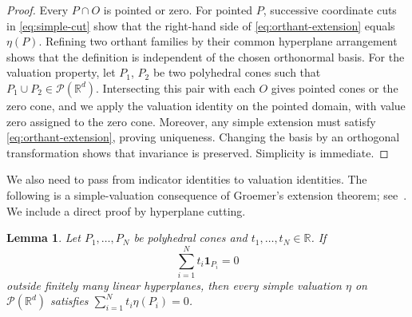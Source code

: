 \documentclass[11pt]{article}
\newcommand{\R}{\mathbb{R}}
\newcommand{\PP}{\mathcal{P}}
\theoremstyle{plain}
\newtheorem{lemma}[theorem]{Lemma}
\theoremstyle{definition}
\begin{document}
\begin{proof}
Every $P\cap O$ is pointed or zero.  For pointed $P$, successive
coordinate cuts in \eqref{eq:simple-cut} show that the right-hand side
of \eqref{eq:orthant-extension} equals $\eta(P)$.  Refining two orthant
families by their common hyperplane arrangement shows that the definition
is independent of the chosen orthonormal basis.
For the valuation property, let $P_1$, $P_2$ be two polyhedral cones such that $P_1\cup P_2\in \PP(\R^d)$.
Intersecting this pair
with each $O$ gives pointed cones or the zero cone, and we apply the
valuation identity on the pointed domain, with value zero assigned to the
zero cone. Moreover, any simple extension must satisfy
\eqref{eq:orthant-extension}, proving uniqueness.  Changing the basis
by an orthogonal transformation shows that invariance is preserved. Simplicity is immediate. 
\end{proof}

We also need to pass from indicator identities to valuation identities.
The following is a simple-valuation consequence of Groemer's extension
theorem; see~\cite[Theorems~1.6.2 and~1.6.5]{Sch22:Convex-Cones}.
We include a direct proof by hyperplane cutting.

\begin{lemma}\label{lem:indicator-cutting}
Let $P_1,\ldots,P_N$ be polyhedral cones and $t_1,\ldots,t_N\in\R$.
If
\[
  \sum_{i=1}^N t_i\mathbf1_{P_i}=0
\]
outside finitely many linear hyperplanes, then every simple valuation
$\eta$ on $\PP(\R^d)$ satisfies $\sum_{i=1}^N t_i\eta(P_i)=0$.
\end{lemma}
\end{document}

